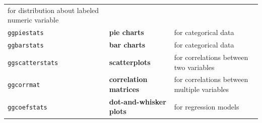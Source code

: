 \documentclass[
]{article}
\begin{document}
\begin{longtable}[]{@{}lll@{}}
\begin{minipage}[t]{0.49\columnwidth}
for distribution about labeled numeric variable\strut
\end{minipage}\tabularnewline
\begin{minipage}[t]{0.17\columnwidth}\raggedright
\texttt{ggpiestats}\strut
\end{minipage} & \begin{minipage}[t]{0.25\columnwidth}\raggedright
\textbf{pie charts}\strut
\end{minipage} & \begin{minipage}[t]{0.49\columnwidth}\raggedright
for categorical data\strut
\end{minipage}\tabularnewline
\begin{minipage}[t]{0.17\columnwidth}\raggedright
\texttt{ggbarstats}\strut
\end{minipage} & \begin{minipage}[t]{0.25\columnwidth}\raggedright
\textbf{bar charts}\strut
\end{minipage} & \begin{minipage}[t]{0.49\columnwidth}\raggedright
for categorical data\strut
\end{minipage}\tabularnewline
\begin{minipage}[t]{0.17\columnwidth}\raggedright
\texttt{ggscatterstats}\strut
\end{minipage} & \begin{minipage}[t]{0.25\columnwidth}\raggedright
\textbf{scatterplots}\strut
\end{minipage} & \begin{minipage}[t]{0.49\columnwidth}\raggedright
for correlations between two variables\strut
\end{minipage}\tabularnewline
\begin{minipage}[t]{0.17\columnwidth}\raggedright
\texttt{ggcorrmat}\strut
\end{minipage} & \begin{minipage}[t]{0.25\columnwidth}\raggedright
\textbf{correlation matrices}\strut
\end{minipage} & \begin{minipage}[t]{0.49\columnwidth}\raggedright
for correlations between multiple variables\strut
\end{minipage}\tabularnewline
\begin{minipage}[t]{0.17\columnwidth}\raggedright
\texttt{ggcoefstats}\strut
\end{minipage} & \begin{minipage}[t]{0.25\columnwidth}\raggedright
\textbf{dot-and-whisker plots}\strut
\end{minipage} & \begin{minipage}[t]{0.49\columnwidth}\raggedright
for regression models\strut
\end{minipage}\tabularnewline
\bottomrule
\end{longtable}
\end{document}
